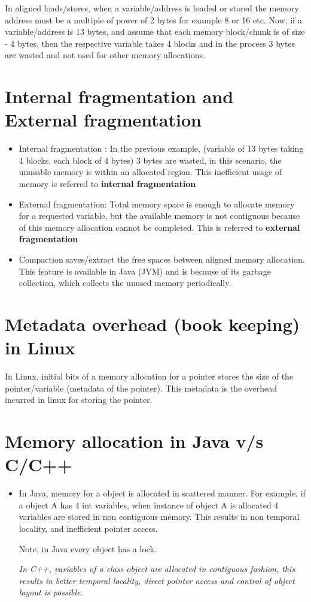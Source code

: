 \documentclass[twoside]{article}
\begin{document}
In aligned loads/stores, when a variable/address is loaded or stored the memory address must be a multiple of power of 2 bytes for example 8 or 16 etc. Now, if a variable/address is 13 bytes, and assume that each memory block/chunk is of  size - 4 bytes, then the respective variable takes 4 blocks and in the process 3 bytes are wasted and not used for other memory allocations.

\section{Internal fragmentation and External fragmentation}

\begin{itemize}
\item Internal fragmentation : In the previous example, (variable of 13 bytes taking 4 blocks, each block of 4 bytes) 3 bytes are wasted, in this scenario, the unusable memory is within an allocated region. This inefficient usage of memory is referred to {\bf internal fragmentation}

\item External fragmentation: Total memory space is enough to allocate memory for a requested variable, but the available memory is not contiguous because of this memory allocation cannot be completed. This is referred to {\bf external fragmentation}

\item Compaction saves/extract the free spaces between aligned memory allocation. This feature is available in Java (JVM) and is because of its garbage collection, which collects the unused memory periodically.

\end{itemize}

\section{Metadata overhead (book keeping) in Linux}

In Linux, initial bits of a memory allocation for a pointer stores the size of the pointer/variable (metadata of the pointer). This metadata is the overhead incurred in linux for storing the pointer.

\section{Memory allocation in Java v/s C/C++}

\begin{itemize}
\item In Java, memory for a object is allocated in scattered manner. For example, if a object A has 4 int variables, when instance of object A is allocated 4 variables are stored in non contiguous memory. This results in non temporal locality, and  inefficient pointer access. 

Note, in Java every object has a lock. 

\it In C++, variables of a class object are allocated in contiguous fashion, this results in better temporal locality, direct pointer access and control of object layout is possible.

\end{itemize}
\end{document}
